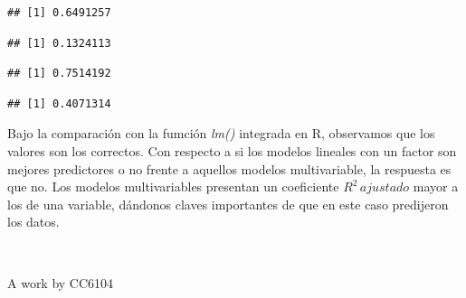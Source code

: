 \documentclass[]{article}
\newenvironment{Shaded}{\begin{snugshade}}{\end{snugshade}}
\newcommand{\FunctionTok}[1]{\textcolor[rgb]{0.00,0.00,0.00}{#1}}
\newcommand{\NormalTok}[1]{#1}
\newcommand{\OtherTok}[1]{\textcolor[rgb]{0.56,0.35,0.01}{#1}}
\newcommand{\SpecialCharTok}[1]{\textcolor[rgb]{0.00,0.00,0.00}{#1}}
\begin{document}
\begin{verbatim}
## [1] 0.6491257
\end{verbatim}

\begin{Shaded}
\end{Shaded}

\begin{verbatim}
## [1] 0.1324113
\end{verbatim}

\begin{Shaded}
\end{Shaded}

\begin{verbatim}
## [1] 0.7514192
\end{verbatim}

\begin{Shaded}
\end{Shaded}

\begin{verbatim}
## [1] 0.4071314
\end{verbatim}

Bajo la comparación con la fumción \emph{lm()} integrada en R,
observamos que los valores son los correctos. Con respecto a si los
modelos lineales con un factor son mejores predictores o no frente a
aquellos modelos multivariable, la respuesta es que no. Los modelos
multivariables presentan un coeficiente \(R^2\,ajustado\) mayor a los de
una variable, dándonos claves importantes de que en este caso predijeron
los datos.

~

A work by CC6104

~
\end{document}
